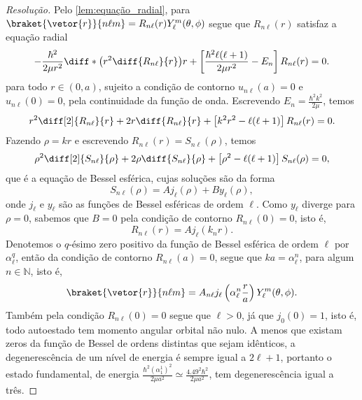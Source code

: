 \begin{proof}[Resolução]
    Pelo \cref{lem:equação_radial}, para \(\braket{\vetor{r}}{n\ell m} = R_{n\ell}(r)Y_{\ell}^m(\theta,\phi)\) segue que \(R_{n\ell}(r)\) satisfaz a equação radial
    \begin{equation*}
        -\frac{\hbar^2}{2\mu r^2}\diff*{\left(r^2 \diff{R_{n\ell}}{r}\right)}{r} + \left[\frac{\hbar^2\ell(\ell+1)}{2\mu r^2} - E_n\right]R_{n\ell}(r) = 0.
    \end{equation*}
    para todo \(r \in (0,a)\), sujeito a condição de contorno \(u_{n \ell}(a) = 0\) e \(u_{n\ell}(0) = 0\), pela continuidade da função de onda. Escrevendo \(E_n = \frac{\hbar^2k^2}{2\mu}\), temos
    \begin{equation*}
        r^2\diff[2]{R_{n\ell}}{r} + 2r\diff{R_{n\ell}}{r} + \left[k^2r^2 - \ell(\ell + 1)\right] R_{n\ell}(r) = 0.
    \end{equation*}
    Fazendo \(\rho = k r\) e escrevendo \(R_{n\ell}(r) = S_{n\ell}(\rho)\), temos
    \begin{equation*}
        \rho^2 \diff[2]{S_{n\ell}}{\rho} + 2\rho \diff{S_{n\ell}}{\rho} + \left[\rho^2 - \ell(\ell + 1)\right] S_{n\ell}(\rho) = 0,
    \end{equation*}
    que é a equação de Bessel esférica, cujas soluções são da forma
    \begin{equation*}
        S_{n\ell}(\rho) = A j_\ell(\rho) + B y_\ell(\rho),
    \end{equation*}
    onde \(j_\ell\) e \(y_\ell\) são as funções de Bessel esféricas de ordem \(\ell\). Como \(y_\ell\) diverge para \(\rho = 0\), sabemos que \(B= 0\) pela condição de contorno \(R_{n\ell}(0) = 0\), isto é,
    \begin{equation*}
        R_{n\ell}(r) = A j_\ell(k_n r).
    \end{equation*}
    Denotemos o \(q\)-ésimo zero positivo da função de Bessel esférica de ordem \(\ell\) por \(\alpha^q_\ell\), então da condição de contorno \(R_{n\ell}(a) = 0\), segue que \(k a = \alpha_\ell^n\), para algum \(n \in \mathbb{N}\), isto é,
    \begin{equation*}
        \braket{\vetor{r}}{n\ell m} = A_{n\ell} j_{\ell}\left(\alpha_\ell^n\frac{r}{a}\right) Y_{\ell}^m(\theta, \phi).
    \end{equation*}
    Também pela condição \(R_{n\ell}(0) = 0\) segue que \(\ell > 0\), já que \(j_0(0) = 1\), isto é, todo autoestado tem momento angular orbital não nulo. A menos que existam zeros da função de Bessel de ordens distintas que sejam idênticos, a degenerescência de um nível de energia é sempre igual a \(2\ell + 1\), portanto o estado fundamental, de energia \(\frac{\hbar^2 (\alpha_{1}^1)^2}{2\mu a^2} \simeq \frac{4.49^2 \hbar^2}{2\mu a^2}\), tem degenerescência igual a três.
\end{proof}

